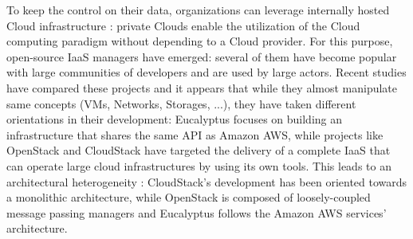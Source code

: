 To keep the control on their data, organizations can leverage internally hosted 
Cloud infrastructure : private Clouds enable the utilization of the Cloud 
computing paradigm without depending to a Cloud provider. For this purpose, 
open-source IaaS managers have emerged: several of them have become popular with
large communities of developers and are used by large actors. Recent studies 
\cite{peng:2009} have compared these projects and it appears that while they 
almost manipulate same concepts (VMs, Networks, Storages, ...), they have taken
different orientations in their development: Eucalyptus focuses on building an 
infrastructure that shares the same API as Amazon AWS, while projects like 
OpenStack and CloudStack have targeted the delivery of a complete IaaS that can
operate large cloud infrastructures by using its own tools. This leads to an 
architectural heterogeneity : CloudStack’s development has been oriented towards
a monolithic architecture, while OpenStack is composed of loosely-coupled 
message passing managers and Eucalyptus follows the Amazon AWS services’
architecture.

